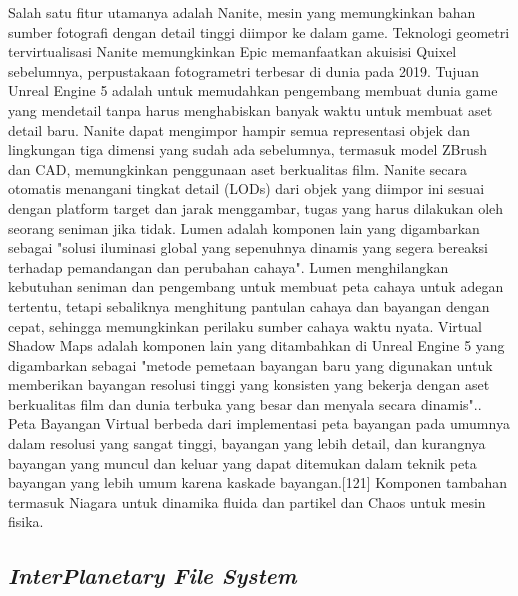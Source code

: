 Salah satu fitur utamanya adalah Nanite, mesin yang memungkinkan bahan sumber fotografi dengan detail tinggi diimpor ke dalam game.\parencite{ValentineRebekah} Teknologi geometri tervirtualisasi Nanite memungkinkan Epic memanfaatkan akuisisi Quixel sebelumnya, perpustakaan fotogrametri terbesar di dunia pada 2019. Tujuan Unreal Engine 5 adalah untuk memudahkan pengembang 
membuat dunia game yang mendetail tanpa harus menghabiskan banyak waktu untuk membuat aset detail baru.\parencite{DeanTakahashi} Nanite dapat mengimpor hampir semua representasi objek dan lingkungan tiga dimensi yang sudah ada sebelumnya, termasuk model ZBrush dan CAD, memungkinkan penggunaan aset berkualitas film.\parencite{AndrewTarantola} Nanite secara otomatis menangani tingkat detail (LODs) 
dari objek yang diimpor ini sesuai dengan platform target dan jarak menggambar, tugas yang harus dilakukan oleh seorang seniman jika tidak.\parencite{KyleOrland} Lumen adalah komponen lain yang digambarkan sebagai "solusi iluminasi global yang sepenuhnya dinamis yang segera bereaksi terhadap pemandangan dan perubahan cahaya". Lumen menghilangkan kebutuhan 
seniman dan pengembang untuk membuat peta cahaya untuk adegan tertentu, tetapi sebaliknya menghitung pantulan cahaya dan bayangan dengan cepat, sehingga memungkinkan perilaku sumber cahaya waktu nyata.\parencite{KyleOrland} Virtual Shadow Maps adalah komponen lain yang ditambahkan di Unreal Engine 5 yang digambarkan sebagai "metode pemetaan bayangan baru yang digunakan 
untuk memberikan bayangan resolusi tinggi yang konsisten yang bekerja dengan aset berkualitas film dan dunia terbuka yang besar dan menyala secara dinamis"..\parencite{VirtualShadowMaps} Peta Bayangan Virtual berbeda dari implementasi peta bayangan pada umumnya dalam resolusi yang sangat tinggi, bayangan yang lebih detail, dan kurangnya bayangan yang muncul dan keluar yang 
dapat ditemukan dalam teknik peta bayangan yang lebih umum karena kaskade bayangan.[121] Komponen tambahan termasuk Niagara untuk dinamika fluida dan partikel dan Chaos untuk mesin fisika.\parencite{DeanTakahashi}

\subsection{\emph{InterPlanetary File System}}

